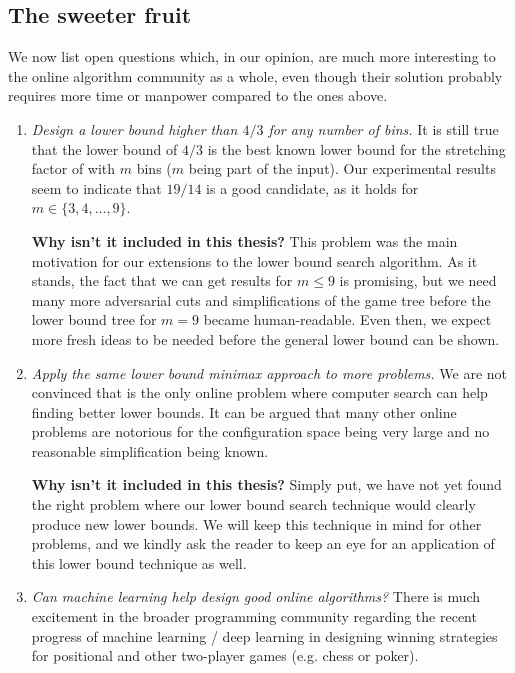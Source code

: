 \subsection{The sweeter fruit}

We now list open questions which, in our opinion, are much more
interesting to the online algorithm community as a whole, even though
their solution probably requires more time or manpower compared to the
ones above.

\begin{enumerate}

\item \textit{Design a lower bound higher than $4/3$ for any number of
bins.} It is still true that the lower bound of $4/3$ is the best
known lower bound for the stretching factor of \binstretch with $m$
bins ($m$ being part of the input). Our experimental results seem to
indicate that $19/14$ is a good candidate, as it holds for $m \in
\{3,4,\ldots,9\}$. 

\noindent\textbf{Why isn't it included in this thesis?} This problem was the
main motivation for our extensions to the lower bound search
algorithm. As it stands, the fact that we can get results for $m \le
9$ is promising, but we need many more adversarial cuts and
simplifications of the game tree before the lower bound tree for $m =
9$ became human-readable. Even then, we expect more fresh ideas to be
needed before the general lower bound can be shown.

\item \textit{Apply the same lower bound minimax approach to more
problems.} We are not convinced that \binstretch is the only online
problem where computer search can help finding better lower bounds.
It can be argued that many other online problems are notorious for the
configuration space being very large and no reasonable simplification
being known.

\noindent\textbf{Why isn't it included in this thesis?} Simply put, we have
not yet found the right problem where our lower bound search technique
would clearly produce new lower bounds. We will keep this technique in
mind for other problems, and we kindly ask the reader to keep an eye
for an application of this lower bound technique as well.

\item \textit{Can machine learning help design good online
algorithms?} There is much excitement in the broader programming
community regarding the recent progress of machine learning / deep
learning in designing winning strategies for positional and other
two-player games (e.g. chess or poker).


\end{enumerate}
